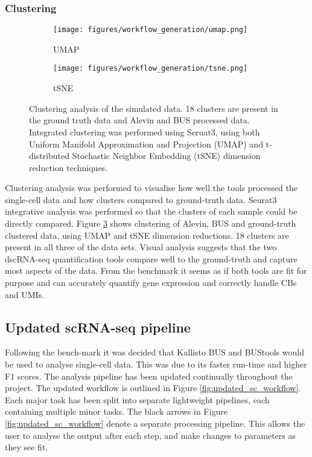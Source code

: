 \subsubsection{Clustering}

\begin{figure}[ht]
\centering
\begin{subfigure}{0.7\textwidth}
    \texttt{[image: figures/workflow\_generation/umap.png]}
    \caption{UMAP}
    \label{fig:benchmark_UMAP}
\end{subfigure}
\medskip
\begin{subfigure}{0.7\textwidth}
    \texttt{[image: figures/workflow\_generation/tsne.png]}
    \caption{tSNE}
    \label{fig:benchmark_tsne}
\end{subfigure}
\caption[Clustering analysis benchmark]{Clustering analysis of the simulated data.
18 clusters are present in the ground truth data and Alevin and BUS processed data.
Integrated clustering was performed using Seruat3\cite{stuart2019comprehensive}, using both Uniform Manifold Approximation and Projection (UMAP) and  t-distributed Stochastic Neighbor Embedding (tSNE) dimension reduction techniques.}
\label{fig:benchmark_clustering}
\end{figure}

Clustering analysis was performed to visualise how well the tools processed the single-cell data and how clusters compared to ground-truth data.
Seurat3 integrative analysis was performed so that the clusters of each sample could be directly compared.
Figure \ref{fig:benchmark_clustering} shows clustering of Alevin, BUS and ground-truth clustered data, using UMAP and tSNE dimension reductions.
18 clusters are present in all three of the data sets.
Visual analysis suggests that the two dscRNA-seq quantification tools compare well to the ground-truth and capture most aspects of the data.
From the benchmark it seems as if both tools are fit for purpose and can accurately quantify gene expression and correctly handle CBs and UMIs.

\afterpage{\clearpage}


\subsection{Updated scRNA-seq pipeline}\label{subsec:updated_scrna}
Following the bench-mark it was decided that Kallisto BUS and BUStools would be used to analyse single-cell data.
This was due to its faster run-time and higher F1 scores.
The analysis pipeline has been updated continually throughout the project.
The updated workflow is outlined in Figure \ref{fig:updated_sc_workflow}.
Each major task has been split into separate lightweight pipelines, each containing multiple minor tasks.
The black arrows in Figure \ref{fig:updated_sc_workflow} denote a separate processing pipeline.
This allows the user to analyse the output after each step, and make changes to parameters as they see fit.

